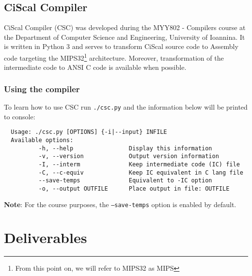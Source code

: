 \documentclass{article}
\def\code#1{\texttt{#1}} %
\begin{document}
\subsection{CiScal Compiler}
CiScal Compiler (CSC) was developed during the MYY802 - Compilers course at the Department of
Computer Science and Engineering, University of Ioannina. It is written in Python 3 and serves
to transform CiScal source code to Assembly code targeting the MIPS32\footnote{From this point on,
we will refer to MIPS32 as MIPS} architecture. Moreover, transformation of the intermediate code
to ANSI C code is available when possible.

\subsubsection{Using the compiler}
To learn how to use CSC run \verb|./csc.py| and the information below will be printed to console:

\begin{verbatim}
  Usage: ./csc.py [OPTIONS] {-i|--input} INFILE
  Available options:
          -h, --help                Display this information
          -v, --version             Output version information
          -I, --interm              Keep intermediate code (IC) file
          -C, --c-equiv             Keep IC equivalent in C lang file
          --save-temps              Equivalent to -IC option
          -o, --output OUTFILE      Place output in file: OUTFILE
\end{verbatim}

\textbf{Note}: For the course purposes, the \code{--save-temps} option is enabled by default.

\newpage



\section{Deliverables}
\end{document}
